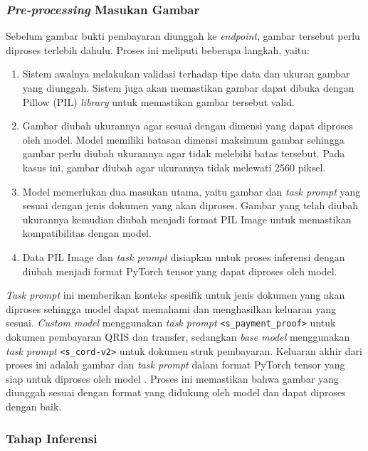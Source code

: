 \subsubsection{\emph{Pre-processing} Masukan Gambar}
\label{subsec:pre-processing}
Sebelum gambar bukti pembayaran diunggah ke \emph{endpoint}, gambar tersebut perlu diproses terlebih dahulu. Proses ini meliputi beberapa langkah, yaitu:
\begin{enumerate}
    \item Sistem awalnya melakukan validasi terhadap tipe data dan ukuran gambar yang diunggah. Sistem juga akan memastikan gambar dapat dibuka dengan Pillow (PIL) \emph{library} untuk memastikan gambar tersebut valid.
    \item Gambar diubah ukurannya agar sesuai dengan dimensi yang dapat diproses oleh model. Model \donut{} memiliki batasan dimensi maksimum gambar sehingga gambar perlu diubah ukurannya agar tidak melebihi batas tersebut. Pada kasus ini, gambar diubah agar ukurannya tidak melewati 2560 piksel.
    \item Model memerlukan dua masukan utama, yaitu gambar dan \emph{task prompt} yang sesuai dengan jenis dokumen yang akan diproses. Gambar yang telah diubah ukurannya kemudian diubah menjadi format PIL Image untuk memastikan kompatibilitas dengan model.
    \item Data PIL Image dan \emph{task prompt} disiapkan untuk proses inferensi dengan diubah menjadi format PyTorch tensor yang dapat diproses oleh model.
\end{enumerate}

\emph{Task prompt} ini memberikan konteks spesifik untuk jenis dokumen yang akan diproses sehingga model dapat memahami dan menghasilkan keluaran yang sesuai. \emph{Custom model} menggunakan \emph{task prompt} \texttt{<s\_payment\_proof>} untuk dokumen pembayaran QRIS dan transfer, sedangkan \emph{base model} menggunakan \emph{task prompt} \texttt{<s\_cord-v2>} untuk dokumen struk pembayaran. Keluaran akhir dari proses ini adalah gambar dan \emph{task prompt} dalam format PyTorch tensor yang siap untuk diproses oleh model \donut. Proses ini memastikan bahwa gambar yang diunggah sesuai dengan format yang didukung oleh model dan dapat diproses dengan baik.

\subsubsection{Tahap Inferensi}
\label{subsubsec:proses-inferens}

